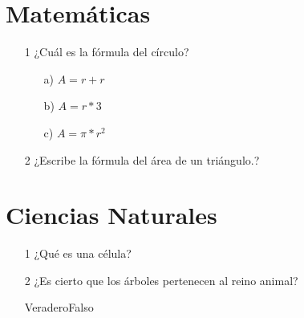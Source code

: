 \documentclass[12pt]{article}
\begin{document}
    \section{Matemáticas}
    \begin{itemize}
        \item[1] ¿Cuál es la fórmula del círculo?
        	\begin{itemize}
        		\item[a)]$A = r + r$
        		\item[b)]$A = r * 3 $
        		\item[c)]$A = \pi * r^2$
        	\end{itemize}
        \item[2] ¿Escribe la fórmula del área de un triángulo.?
        	\newline
        	\newline
    \end{itemize}
    \newpage
    \section{Ciencias Naturales}
    \begin{itemize}
        \item[1] ¿Qué es una célula?
        	\newline
        	\newline
        	\newline
        	\newline
        \item[2] ¿Es cierto que los árboles pertenecen al reino animal?
        	\newline
        	\newline \centerline{Veradero\hspace{5cm}Falso\hspace{3cm}}
        	\newline
    \end{itemize}
\end{document}

